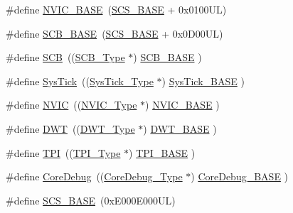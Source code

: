 \begin{DoxyCompactItemize}
\item 
\#define \hyperlink{group___c_m_s_i_s__core__base_gaa0288691785a5f868238e0468b39523d}{N\+V\+I\+C\+\_\+\+B\+A\+SE}~(\hyperlink{group___c_m_s_i_s__core__base_ga3c14ed93192c8d9143322bbf77ebf770}{S\+C\+S\+\_\+\+B\+A\+SE} +  0x0100\+U\+L)
\item 
\#define \hyperlink{group___c_m_s_i_s__core__base_gad55a7ddb8d4b2398b0c1cfec76c0d9fd}{S\+C\+B\+\_\+\+B\+A\+SE}~(\hyperlink{group___c_m_s_i_s__core__base_ga3c14ed93192c8d9143322bbf77ebf770}{S\+C\+S\+\_\+\+B\+A\+SE} +  0x0\+D00\+U\+L)
\item 
\#define \hyperlink{group___c_m_s_i_s__core__base_gaaaf6477c2bde2f00f99e3c2fd1060b01}{S\+CB}~((\hyperlink{struct_s_c_b___type}{S\+C\+B\+\_\+\+Type}       $\ast$)     \hyperlink{group___c_m_s_i_s__core__base_gad55a7ddb8d4b2398b0c1cfec76c0d9fd}{S\+C\+B\+\_\+\+B\+A\+SE}         )
\item 
\#define \hyperlink{group___c_m_s_i_s__core__base_gacd96c53beeaff8f603fcda425eb295de}{Sys\+Tick}~((\hyperlink{struct_sys_tick___type}{Sys\+Tick\+\_\+\+Type}   $\ast$)     \hyperlink{group___c_m_s_i_s__core__base_ga58effaac0b93006b756d33209e814646}{Sys\+Tick\+\_\+\+B\+A\+SE}     )
\item 
\#define \hyperlink{group___c_m_s_i_s__core__base_gac8e97e8ce56ae9f57da1363a937f8a17}{N\+V\+IC}~((\hyperlink{struct_n_v_i_c___type}{N\+V\+I\+C\+\_\+\+Type}      $\ast$)     \hyperlink{group___c_m_s_i_s__core__base_gaa0288691785a5f868238e0468b39523d}{N\+V\+I\+C\+\_\+\+B\+A\+SE}        )
\item 
\#define \hyperlink{group___c_m_s_i_s__core__base_gabbe5a060185e1d5afa3f85b14e10a6ce}{D\+WT}~((\hyperlink{struct_d_w_t___type}{D\+W\+T\+\_\+\+Type}       $\ast$)     \hyperlink{group___c_m_s_i_s__core__base_gafdab534f961bf8935eb456cb7700dcd2}{D\+W\+T\+\_\+\+B\+A\+SE}         )
\item 
\#define \hyperlink{group___c_m_s_i_s__core__base_ga8b4dd00016aed25a0ea54e9a9acd1239}{T\+PI}~((\hyperlink{struct_t_p_i___type}{T\+P\+I\+\_\+\+Type}       $\ast$)     \hyperlink{group___c_m_s_i_s__core__base_ga2b1eeff850a7e418844ca847145a1a68}{T\+P\+I\+\_\+\+B\+A\+SE}         )
\item 
\#define \hyperlink{group___c_m_s_i_s__core__base_gab6e30a2b802d9021619dbb0be7f5d63d}{Core\+Debug}~((\hyperlink{struct_core_debug___type}{Core\+Debug\+\_\+\+Type} $\ast$)     \hyperlink{group___c_m_s_i_s__core__base_ga680604dbcda9e9b31a1639fcffe5230b}{Core\+Debug\+\_\+\+B\+A\+SE}   )
\item 
\#define \hyperlink{group___c_m_s_i_s__core__base_ga3c14ed93192c8d9143322bbf77ebf770}{S\+C\+S\+\_\+\+B\+A\+SE}~(0x\+E000\+E000\+U\+L)

\end{DoxyCompactItemize}
